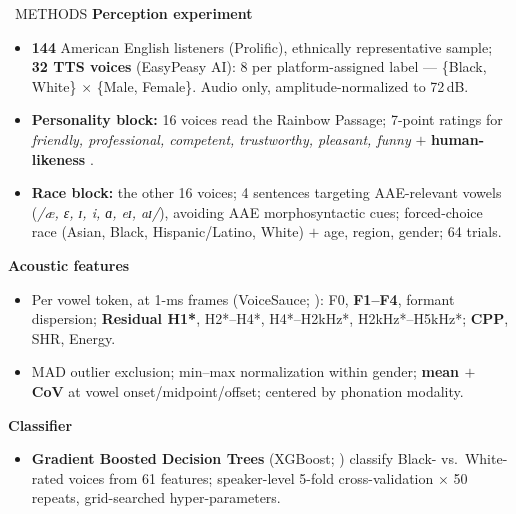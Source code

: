 \documentclass[final,20pt]{beamer}
\newcommand{\ipa}[1]{\textit{/#1/}}
\newlength{\colwidth}
\begin{document}
\begin{frame}[t]
\begin{columns}[t]
\begin{column}{\colwidth}
\begin{block}{~METHODS}
    \textbf{Perception experiment}
    \begin{itemize}
        \item \textbf{144} American English listeners (Prolific), ethnically representative sample; \textbf{32 TTS voices} (EasyPeasy AI): 8 per platform-assigned label --- \{Black, White\} $\times$ \{Male, Female\}. Audio only, amplitude-normalized to 72\,dB.
        \item \textbf{Personality block:} 16 voices read the Rainbow Passage; 7-point ratings for \textit{friendly, professional, competent, trustworthy, pleasant, funny} $+$ \textbf{human-likeness} \citep{holliday_siri_2023}.
        \item \textbf{Race block:} the other 16 voices; 4 sentences targeting AAE-relevant vowels (\ipa{æ, ɛ, ɪ, i, ɑ, eɪ, aɪ}), avoiding AAE morphosyntactic cues; forced-choice race (Asian, Black, Hispanic/Latino, White) $+$ age, region, gender; 64 trials.
    \end{itemize}

    \vspace{.5em}
    \textbf{Acoustic features} \hfill {\footnotesize \citep[Psychoacoustic Model of the Voice;][]{kreiman_toward_2014}}
    \begin{itemize}
        \item Per vowel token, at 1-ms frames (VoiceSauce; \citealt{Shue2009}): F0, \textbf{F1--F4}, formant dispersion; \textbf{Residual H1*}, H2*--H4*, H4*--H2kHz*, H2kHz*--H5kHz*; \textbf{CPP}, SHR, Energy.
        \item MAD outlier exclusion; min--max normalization within gender; \textbf{mean $+$ CoV} at vowel onset/midpoint/offset; centered by phonation modality.
    \end{itemize}

    \vspace{.5em}
    \textbf{Classifier}
    \begin{itemize}
        \item \textbf{Gradient Boosted Decision Trees} (XGBoost; \citealt{chen2024}) classify Black- vs.\ White-rated voices from 61 features; speaker-level 5-fold cross-validation $\times$ 50 repeats, grid-searched hyper-parameters.
    \end{itemize}

\end{block}

\begin{alertblock}{}
    \scriptsize{%
    }
\end{alertblock}


\end{column}
\end{columns}
\end{frame}
\end{document}
